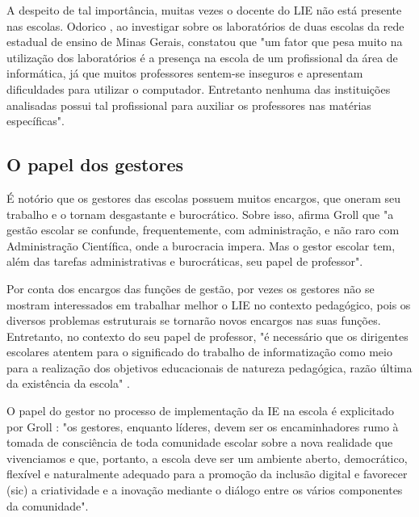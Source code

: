 A despeito de tal importância, muitas vezes o docente do LIE não está presente nas escolas. Odorico \cite{art:REF_ART_ODORICO}, ao investigar sobre os laboratórios de duas escolas da rede estadual de ensino de Minas Gerais, constatou que "um fator que pesa muito na utilização dos laboratórios é a presença na escola de um profissional da área de informática, já que muitos professores sentem-se inseguros e apresentam dificuldades para utilizar o computador. Entretanto nenhuma das instituições analisadas possui tal profissional para auxiliar os professores nas matérias específicas".

\subsection{O papel dos gestores}\label{sec:LABEL_CHP_REF_TEO_SEC_RES_GEST}

É notório que os gestores das escolas possuem muitos encargos, que oneram seu trabalho e o tornam desgastante e burocrático. Sobre isso, afirma Groll \cite{art:REF_TCC_GROLL} que "a gestão escolar se confunde, frequentemente, com administração, e não raro com Administração Científica, onde a burocracia impera. Mas o gestor escolar tem, além das tarefas administrativas e burocráticas, seu papel de professor".

Por conta dos encargos das funções de gestão, por vezes os gestores não se mostram interessados em trabalhar melhor o LIE no contexto pedagógico, pois os diversos problemas estruturais se tornarão novos encargos nas suas funções. Entretanto, no contexto do seu papel de professor, "é necessário que os dirigentes escolares atentem para o significado do trabalho de informatização como meio para a realização dos objetivos educacionais de natureza pedagógica, razão última da existência da escola" \cite{art:REF_TCC_GROLL}.

O papel do gestor no processo de implementação da IE na escola é explicitado por Groll \cite{art:REF_TCC_GROLL}: "os gestores, enquanto líderes, devem ser os encaminhadores rumo à tomada de consciência de toda comunidade escolar sobre a nova realidade que vivenciamos e que, portanto, a escola deve ser um ambiente aberto, democrático, flexível e naturalmente adequado para a promoção da inclusão digital e favorecer (sic) a criatividade e a inovação mediante o diálogo entre os vários componentes da comunidade".

